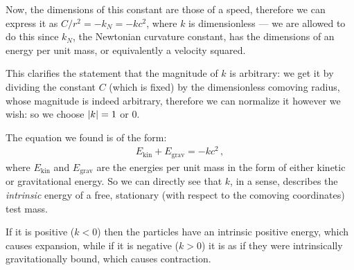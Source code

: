 \documentclass[main.tex]{subfiles}
\begin{document}
Now, the dimensions of this constant are those of a speed, therefore we can express it as \(C / r^2 = -k_N = -k c^2\), where \(k\) is dimensionless --- we are allowed to do this since \(k_N\), the Newtonian curvature constant, has the dimensions of an energy per unit mass, or equivalently a velocity squared.

This clarifies the statement that the magnitude of \(k\) is arbitrary: we get it by dividing the constant \(C\) (which is fixed) by the dimensionless comoving radius, whose magnitude is indeed arbitrary, therefore we can normalize it however we wish: so we choose \(\abs{k} = 1\) or 0.

\begin{bluebox}
The equation we found is of the form: 
%
\begin{align}
E _{\text{kin}} + E _{\text{grav}} = -k c^2
\,,
\end{align}
%
where \(E _{\text{kin}}\) and \(E _{\text{grav}}\) are the energies per unit mass in the form of either kinetic or gravitational energy.
So we can directly see that \(k\), in a sense, describes the \emph{intrinsic} energy of a free, stationary (with respect to the comoving coordinates) test mass.

If it is positive (\(k<0\)) then the particles have an intrinsic positive energy, which causes expansion, while if it is negative (\(k>0\)) it is as if they were intrinsically gravitationally bound, which causes contraction.
\end{bluebox}

\end{document}
